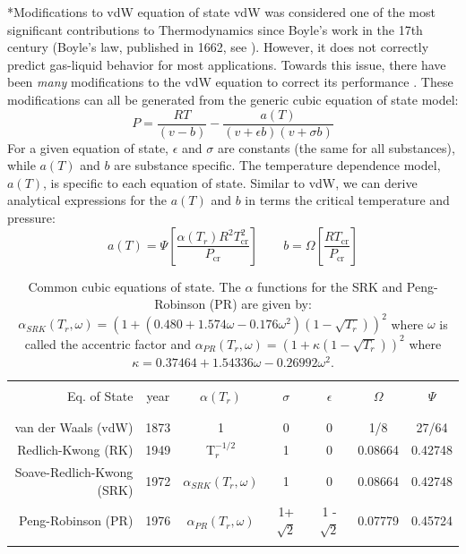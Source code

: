 \documentclass[11pt]{article}
\makeatletter
\theoremstyle{definition}
\renewcommand\subsection{\@startsection
	{subsection}{2}{0mm}
	{-0.05in}
	{0.5\baselineskip}
	{\normalfont\normalsize\bfseries}}
\makeatother
\begin{document}
\subsection*{Modifications to vdW equation of state}
vdW was considered one of the most significant contributions to Thermodynamics since Boyle's work in the 17th century (Boyle's law, published in 1662, see \cite{West:2005aa}).
However, it does not correctly predict gas-liquid behavior for most applications.
Towards this issue, there have been \textit{many} modifications to the vdW equation to correct its performance \cite{Valderrama2003}.
These modifications can all be generated from the generic cubic equation of state model:
\begin{equation}\label{eq:generic-model}
P = \frac{RT}{\left(v-b\right)}-\frac{a(T)}{\left(v+\epsilon b\right)\left(v+\sigma b\right)}
\end{equation}
For a given equation of state, $\epsilon$ and $\sigma$ are constants (the same for all substances), while
$a(T)$ and $b$ are substance specific. The temperature dependence model, $a(T)$, is specific to each equation of state.
Similar to vdW, we can derive analytical expressions for the $a(T)$ and $b$ in terms the critical temperature and pressure:
\begin{equation}
	a\left(T\right) = \Psi\left[\frac{\alpha\left(T_{r}\right)R^{2}T^{2}_{\mathrm{cr}}}{P_{\mathrm{cr}}}\right]\qquad
	b = \Omega\left[\frac{RT_{\mathrm{cr}}}{P_{\mathrm{cr}}}\right]
\end{equation}

\begin{table}
	\caption{Common cubic equations of state. The $\alpha$ functions for the SRK and Peng-Robinson (PR) are given by: $\alpha_{SRK}\left(T_{r},\omega\right)=\left(1+\left(0.480+1.574\omega-0.176\omega^{2}\right)\left(1-\sqrt{T_{r}}\right)\right)^{2}$ where $\omega$ is called the
	accentric factor and $\alpha_{PR}\left(T_{r},\omega\right)=\left(1+\kappa\left(1-\sqrt{T_{r}}\right)\right)^{2}$ where $\kappa=0.37464+1.54336\omega-0.26992\omega^{2}$.
	}
\begin{center}
\begin{tabular}{rcccccc}
	\hline\\
	Eq. of State & year & $\alpha\left(T_{r}\right)$ & $\sigma$ & $\epsilon$ & $\Omega$ & $\Psi$ \\\\
	\hline\\

	van der Waals (vdW) & 1873 & 1 & 0 & 0 & 1/8 & 27/64 \\
	Redlich-Kwong (RK) & 1949 & T$_{r}^{-1/2}$ & 1 & 0 & 0.08664 & 0.42748 \\
	Soave-Redlich-Kwong (SRK) & 1972 & $\alpha_{SRK}\left(T_{r},\omega\right)$ & 1 & 0 & 0.08664 & 0.42748 \\
	Peng-Robinson (PR) & 1976 & $\alpha_{PR}\left(T_{r},\omega\right)$ & 1+$\sqrt{2}$ & 1 - $\sqrt{2}$ & 0.07779 & 0.45724 \\\\

	\hline
\end{tabular}
\end{center}
\end{table}
\end{document}
